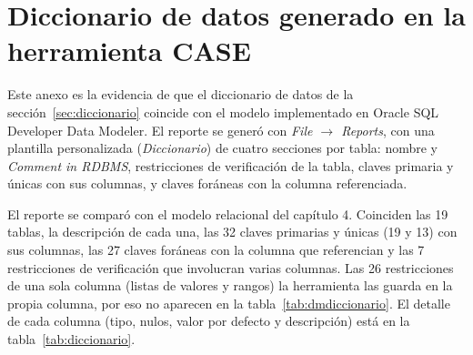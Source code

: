 
\section{Diccionario de datos generado en la herramienta CASE}
\label{anx:dmdiccionario}

Este anexo es la evidencia de que el diccionario de datos de la
sección~\ref{sec:diccionario} coincide con el modelo implementado en
Oracle SQL Developer Data Modeler. El reporte se generó con
\textit{File $\rightarrow$ Reports}, con una plantilla personalizada
(\textit{Diccionario}) de cuatro secciones por tabla: nombre y
\textit{Comment in RDBMS}, restricciones de verificación de la tabla,
claves primaria y únicas con sus columnas, y claves foráneas con la
columna referenciada.

El reporte se comparó con el modelo relacional del capítulo 4. Coinciden las
19 tablas, la descripción de cada una, las 32 claves primarias y únicas
(19 y 13) con sus columnas, las 27 claves foráneas con la columna que
referencian y las 7 restricciones de verificación que involucran varias
columnas. Las 26 restricciones de una sola columna (listas de valores y
rangos) la herramienta las guarda en la propia columna, por eso no
aparecen en la tabla~\ref{tab:dmdiccionario}. El detalle de cada
columna (tipo, nulos, valor por defecto y descripción) está en la
tabla~\ref{tab:diccionario}.

